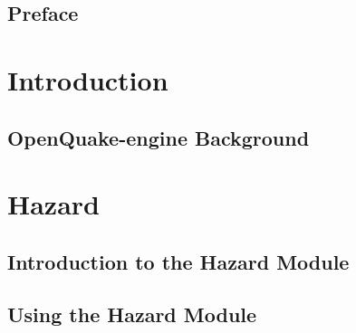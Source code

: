 \documentclass[11pt,fleqn]{book} %
\begin{document}
\pagestyle{empty} %
\tableofcontents %
\cleardoublepage %
\pagestyle{fancy} %

\chapter*{Preface}



\part{Introduction}
\label{part:introduction}
\chapter{OpenQuake-engine Background}
	

\thispagestyle{empty}
\part{Hazard}

\chapter{Introduction to the Hazard Module}
   \label{chap:hazintro}
	
   \cleardoublepage

\chapter{Using the Hazard Module}
	\label{chap:hazinputs}
	
   \cleardoublepage
\end{document}

